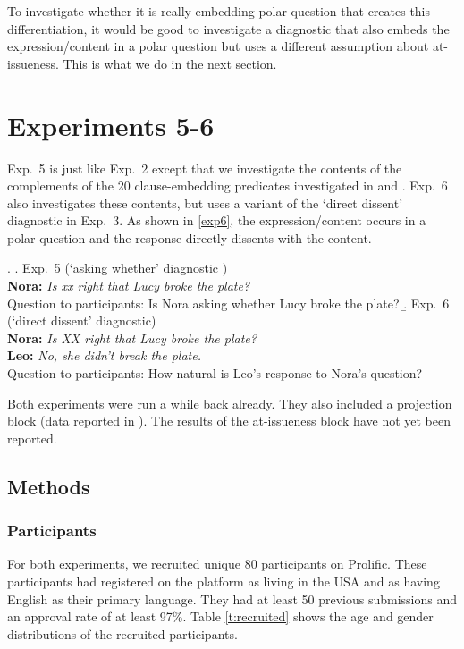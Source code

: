 \documentclass[times,linguex,xcolor]{glossa}
\begin{document}
   To investigate whether it is really embedding polar question that creates this differentiation, it would be good to investigate a diagnostic that also embeds the expression/content in a polar question but uses a different assumption about at-issueness. This is what we do in the next section.
        
\section{Experiments 5-6 \label{sec:3_more-experiments}}

  Exp.~5 is just like Exp.~2 except that we investigate the contents of the complements of the 20 clause-embedding predicates investigated in \citealt{tonhauser_how_2018} and \citealt{degen-tonhauser-glossa}. Exp.~6 also investigates these contents, but uses a variant of the `direct dissent' diagnostic in Exp.~3. As shown in \ref{exp6}, the expression/content occurs in a polar question and the response directly dissents with the content. 

  \ex.
  \a.\label{exp5} Exp.~5 (`asking whether' diagnostic )
  \\ {\bf Nora:} \emph{Is xx right that Lucy broke the plate?}
  \\ Question to participants: Is Nora asking whether Lucy broke the plate?
  \b.\label{exp6} Exp.~6 (`direct dissent' diagnostic)
  \\ {\bf Nora:} \emph{Is XX right that Lucy broke the plate?}
  \\ {\bf Leo:} \emph{No, she didn't break the plate.}
  \\ Question to participants: How natural is Leo's response to Nora's question?

  Both experiments were run a while back already. They also included a projection block (data reported in \citealt{hofmann-etal2024}). The results of the at-issueness block have not yet been reported.

  \subsection{Methods}

  \subsubsection{Participants}

  For both experiments, we recruited unique 80 participants on Prolific. These participants had registered on the platform as living in the USA and as having English as their primary language. They had at least 50 previous submissions and an approval rate of at least 97\%.  Table \ref{t:recruited} shows the age and gender distributions of the recruited participants.
\end{document}

